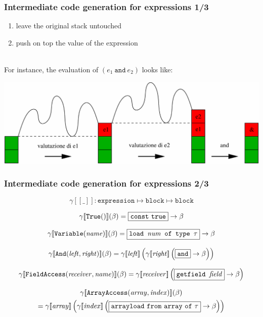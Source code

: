 \documentclass[11pt]{beamer}  %
\begin{document}
\begin{frame}
\frametitle{Intermediate code generation for expressions 1/3}
\begin{enumerate}
\item leave the original stack untouched
\item push on top the value of the expression
\end{enumerate}

\mbox{}\\
For instance, the evaluation of $(e_1 \mathtt{\ and\ } e_2)$ looks like:
\begin{center}
\includegraphics[scale=0.5]{pictures/importanza.pdf}
\end{center}

\end{frame}

\newcommand{\gen}[1]{\gamma[\![{#1}]\!]}
\newcommand{\gentwo}[2]{\gamma^{#1}[\![{#2}]\!]}

\begin{frame}
\frametitle{Intermediate code generation for expressions 2/3}

\[
  \boxed{\gen{\_}:\mathtt{expression}\mapsto
    \mathtt{block}\mapsto\mathtt{block}}
\]

\[
  \gen{\mathtt{True()}}(\beta)=\fbox{$\mathtt{const\ true}$}\to\beta
\]

\[
  \gen{\mathtt{Variable(\mathit{name})}}(\beta)=\fbox{\texttt{load $\mathit{num}$ of type $\tau$}}\to\beta
\]

\[
  \gen{\mathtt{And(\mathit{left},\mathit{right})}}(\beta)=
    \gen{\mathit{left}}\left(
      \gen{\mathit{right}}\left(\fbox{$\mathtt{and}$}\to\beta\right)\right)
\]

\[
  \gen{\mathtt{FieldAccess(\mathit{receiver},\mathit{name})}}(\beta)=
    \gen{\mathit{receiver}}\left(\fbox{\texttt{getfield $\mathit{field}$}}
    \to\beta\right)
\]

\begin{multline*}
   \gen{\mathtt{ArrayAccess(\mathit{array},\mathit{index})}}(\beta)\\
    =\gen{\mathit{array}}\left(\gen{\mathit{index}}\left(
    \fbox{$\mathtt{arrayload\ from\ array\ of\ }\tau$}\to\beta\right)\right)
\end{multline*}

\end{frame}
\end{document}
